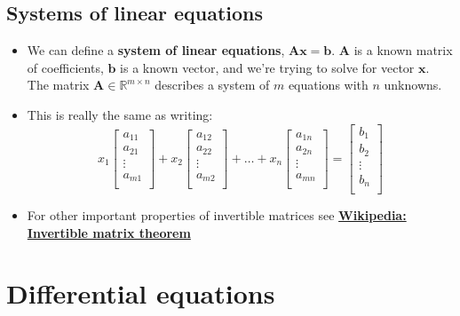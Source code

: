 \documentclass{article}
\begin{document}
\begin{multicols*}{2}
\subsection{Systems of linear equations}
\begin{itemize}
    \item We can define a \textbf{system of linear equations}, $\bm{Ax}=\bm{b}$. $\bm{A}$ is a known matrix of coefficients, $\bm{b}$ is a known vector, and we're trying to solve for vector $\bm{x}$. The matrix $\bm{A} \in \mathbb{R}^{m \times n}$ describes a system of $m$ equations with $n$ unknowns.
    \item This is really the same as writing:
    $$ x_1 \begin{bmatrix}
     a_{11}\\
     a_{21}\\
     \vdots \\
     a_{m1}\\ \end{bmatrix} +
     x_2 \begin{bmatrix}
     a_{12}\\
     a_{22}\\
     \vdots \\
     a_{m2}\\ \end{bmatrix} +
     \hdots +
     x_n \begin{bmatrix}
     a_{1n}\\
     a_{2n}\\
     \vdots \\
     a_{mn}\\ \end{bmatrix} =
     \begin{bmatrix}
     b_{1}\\
     b_{2}\\
     \vdots \\
     b_{n}\\ \end{bmatrix}
     $$

    \item For other important properties of invertible matrices see \href{https://en.wikipedia.org/wiki/Invertible_matrix#The_invertible_matrix_theorem}
    {\textbf{Wikipedia: Invertible matrix theorem}}
    \end{itemize}

\section{Differential equations}

\end{multicols*}
\end{document}
